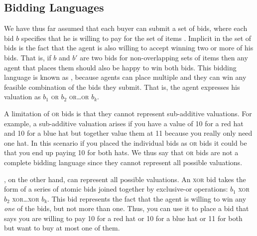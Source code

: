 

\subsection{Bidding Languages}
\label{sec:compl-bidd-lang}

We have thus far assumed that each buyer can submit a set of bids,
where each bid $b$ specifies that he is willing to pay \bidv{} for the
set of items \bidi{}. Implicit in the set of bids is the fact that the
agent is also willing to accept winning two or more of his bids.  That
is, if $b$ and $b'$ are two bids for non-overlapping sets of items
then any agent that places them should also be happy to win both bids.
This bidding language is known as ,
because agents can place multiple  and they can win
any feasible combination of the bids they submit. That is, the agent
expresses his valuation as $b_1$ \textsc{or} $b_2$
\textsc{or}\ldots\textsc{or} $b_k$.

A limitation of \textsc{or} bids is that they cannot represent
sub-additive valuations.  For example, a sub-additive valuation arises
if you have a value of 10 for a red hat and 10 for a blue hat but
together value them at 11 because you really only need one hat. In
this scenario if you placed the individual bids as \textsc{or} bids it
could be that you end up paying 10 for both hats. We thus say that
\textsc{or} bids are not a complete bidding language since they cannot
represent all possible valuations.

, on the other hand, can represent
all possible valuations. An \textsc{xor} bid takes the form of a
series of atomic bids joined together by exclusive-or operations:
$b_1$ \textsc{xor} $b_2$ \textsc{xor}\ldots\textsc{xor} $b_k$. This
bid represents the fact that the agent is willing to win any
\emph{one} of the bids, but not more than one. Thus, you can use it to
place a bid that says you are willing to pay 10 for a red hat or 10
for a blue hat or 11 for both but want to buy at most one of them.

